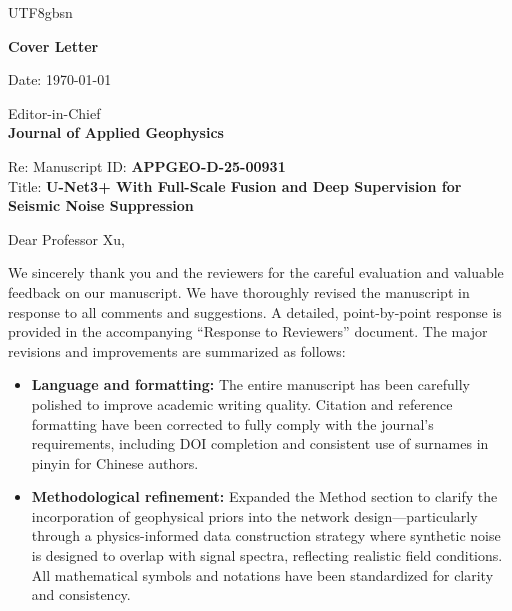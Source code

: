 \documentclass[12pt]{article}
\begin{document}
\begin{CJK}{UTF8}{gbsn}

\begin{center}
{\LARGE \textbf{Cover Letter}}
\end{center}

\vspace{6pt}

\noindent
Date: \today

\vspace{6pt}

\noindent
Editor-in-Chief\\
\textbf{Journal of Applied Geophysics}

\vspace{12pt}

\noindent
Re: Manuscript ID: \textbf{APPGEO-D-25-00931} \\
Title: \textbf{U-Net3+ With Full-Scale Fusion and Deep Supervision for Seismic Noise Suppression}

\vspace{8pt}

\noindent
Dear Professor Xu,

\vspace{6pt}

\noindent
We sincerely thank you and the reviewers for the careful evaluation and valuable feedback on our manuscript. 
We have thoroughly revised the manuscript in response to all comments and suggestions. 
A detailed, point-by-point response is provided in the accompanying “Response to Reviewers” document. 
The major revisions and improvements are summarized as follows:

\vspace{6pt}
\begin{itemize}
  \setlength\itemsep{2pt}
  \item \textbf{Language and formatting:} 
  The entire manuscript has been carefully polished to improve academic writing quality. 
  Citation and reference formatting have been corrected to fully comply with the journal’s requirements, including DOI completion and consistent use of surnames in pinyin for Chinese authors.
  
  \item \textbf{Methodological refinement:} 
  Expanded the Method section to clarify the incorporation of geophysical priors into the network design—particularly through a physics-informed data construction strategy where synthetic noise is designed to overlap with signal spectra, reflecting realistic field conditions. 
  All mathematical symbols and notations have been standardized for clarity and consistency.
  

\end{itemize}
\end{CJK}
\end{document}
